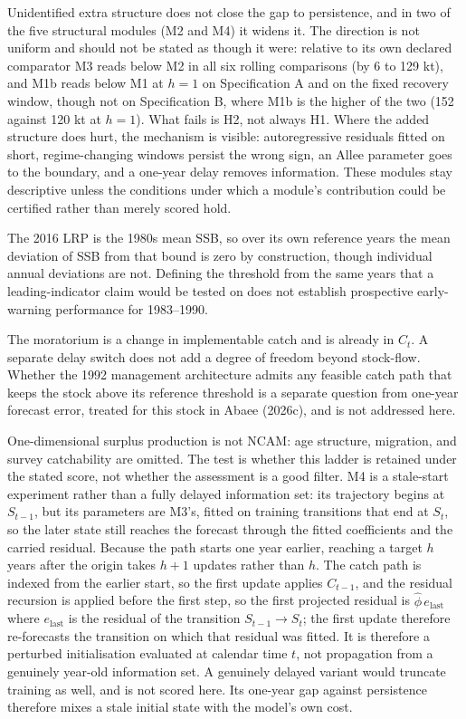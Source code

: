 \documentclass[11pt]{article}
\begin{document}
Unidentified extra structure does not close the gap to persistence, and
in two of the five structural modules (M2 and M4) it widens it. The direction is not uniform
and should not be stated as though it were: relative to its own declared
comparator M3 reads below M2 in all six rolling comparisons (by 6 to 129
kt), and M1b reads below M1 at \(h=1\) on Specification A and on the
fixed recovery window, though not on Specification B, where M1b is the
higher of the two (152 against 120 kt at \(h=1\)). What fails is H2, not always H1. Where the added
structure does hurt, the mechanism is visible: autoregressive residuals
fitted on short, regime-changing windows persist the wrong sign, an
Allee parameter goes to the boundary, and a one-year delay removes
information. These modules stay descriptive unless the conditions under
which a module's contribution could be certified rather than merely
scored hold.

The 2016 LRP is the 1980s mean SSB, so over its own reference years the
mean deviation of SSB from that bound is zero by construction, though
individual annual deviations are not. Defining the threshold from the
same years that a leading-indicator claim would be tested on does not
establish prospective early-warning performance for 1983--1990.

The moratorium is a change in implementable catch and is already in
\(C_t\). A separate delay switch does not add a degree of freedom beyond
stock-flow. Whether the 1992 management architecture admits any feasible
catch path that keeps the stock above its reference threshold is a
separate question from one-year forecast error, treated for this stock
in Abaee (2026c), and is not addressed
here.

One-dimensional surplus production is not NCAM: age structure,
migration, and survey catchability are omitted. The test is whether this
ladder is retained under the stated score, not whether the assessment is
a good filter. M4 is a stale-start experiment rather than a fully delayed information
set: its trajectory begins at \(S_{t-1}\), but its parameters are
M3's, fitted on training transitions that end at \(S_t\), so the
later state still reaches the forecast through the fitted coefficients
and the carried residual. Because the path starts one year earlier,
reaching a target \(h\) years after the origin takes \(h+1\) updates
rather than \(h\). The catch path is indexed from the earlier start, so
the first update applies \(C_{t-1}\), and the residual recursion is
applied before the first step, so the first projected residual is
\(\hat\phi\,e_{\mathrm{last}}\) where \(e_{\mathrm{last}}\) is the
residual of the transition \(S_{t-1}\to S_t\); the first update
therefore re-forecasts the transition on which that residual was fitted.
It is therefore a perturbed
initialisation evaluated at calendar time \(t\), not propagation from a
genuinely year-old information set. A genuinely delayed variant would truncate
training as well, and is not scored here. Its one-year gap against
persistence therefore mixes a stale initial state with the model's own
cost.
\end{document}
